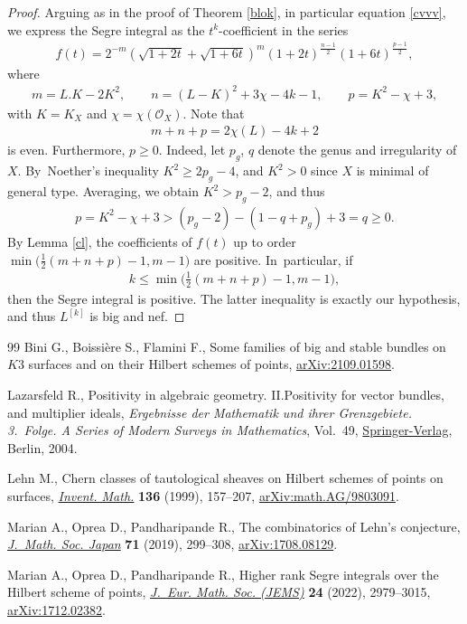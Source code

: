 \documentclass[11pt]{article}
\numberwithin{equation}{section}
\numberwithin{equation}{section}
\begin{document}
\begin{proof}
Arguing as in the proof of Theorem \ref{blok}, in particular equation \eqref{cvvv}, we express the Segre integral as the $t^k$-coefficient in the series
\begin{gather*}
f(t)=2^{-m} \left(\sqrt{1+2t}+\sqrt{1+6t}\right)^m {(1+2t)}^{\frac{n-1}{2}} (1+6t)^{\frac{p-1}{2}},
\end{gather*}
where
\begin{gather*}
m=L.K-2K^2, \qquad n=(L-K)^2+3\chi - 4k - 1, \qquad p=K^2-\chi+3,
\end{gather*}
with $K=K_X$ and $\chi=\chi(\mathcal O_X)$. Note that
\begin{gather*}
m+n+p=2\chi(L)-4k+2
\end{gather*}
is even. Furthermore, $p\geq 0$. Indeed, let $p_g$, $q$ denote the genus and irregularity of $X$. By~Noet\-her's inequality $K^2\geq 2p_g-4$, and $K^2>0$ since $X$ is minimal of general type. Averaging, we obtain $K^2>p_g-2$, and thus
\begin{gather*}
p=K^2-\chi+3>(p_g-2)-(1-q+p_g)+3=q\geq 0.
\end{gather*}
By Lemma \ref{cl}, the coefficients of
$f(t)$ up to order $\min\big(\frac{1}{2} (m+n+p)-1, m-1\big)$ are positive. In~particular, if
\begin{gather*}
k\leq \min\bigg(\frac{1}{2} (m+n+p)-1, m-1\bigg),
\end{gather*}
then the Segre integral is positive. The latter inequality is exactly our hypothesis, and thus $L^{[k]}$ is big and nef.
\end{proof}

\begin{thebibliography}{99}
Bini G., Boissi\`ere S., Flamini F., Some families of big and stable bundles on
 $K3$ surfaces and on their Hilbert schemes of points, \href{https://arxiv.org/abs/2109.01598}{arXiv:2109.01598}.

Lazarsfeld R., Positivity in algebraic geometry. {II}.Positivity for vector
 bundles, and multiplier ideals, \textit{Ergebnisse der Mathematik und ihrer
 Grenzgebiete. 3.~Folge. A Series of Modern Surveys in Mathematics}, Vol.~49,
 \href{https://doi.org/10.1007/978-3-642-18810-7}{Springer-Verlag}, Berlin, 2004.

Lehn M., Chern classes of tautological sheaves on {H}ilbert schemes of points
 on surfaces, \href{https://doi.org/10.1007/s002220050307}{\textit{Invent. Math.}} \textbf{136} (1999), 157--207,
 \href{https://arxiv.org/abs/math.AG/9803091}{arXiv:math.AG/9803091}.

Marian A., Oprea D., Pandharipande R., The combinatorics of {L}ehn's
 conjecture, \href{https://doi.org/10.2969/jmsj/78747874}{\textit{J.~Math. Soc. Japan}} \textbf{71} (2019), 299--308,
 \href{https://arxiv.org/abs/1708.08129}{arXiv:1708.08129}.

Marian A., Oprea D., Pandharipande R., Higher rank {S}egre integrals over the
 {H}ilbert scheme of points, \href{https://doi.org/10.4171/jems/1149}{\textit{J.~Eur. Math. Soc. (JEMS)}} \textbf{24}
 (2022), 2979--3015, \href{https://arxiv.org/abs/1712.02382}{arXiv:1712.02382}.

\end{thebibliography}
\end{document}
